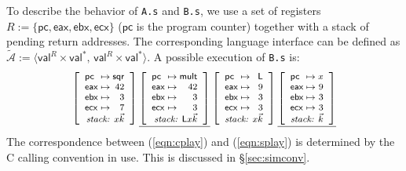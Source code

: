 \documentclass[sigplan,screen]{acmart}
\newcommand{\kw}[1]{\ensuremath{ \mathsf{#1} }}
\begin{document}
\begin{example}
To describe the behavior of \texttt{A.s} and \texttt{B.s},
we use a set of registers
$R := \{ \kw{pc}, \kw{eax}, \kw{ebx}, \kw{ecx} \}$
($\kw{pc}$ is the program counter)
together with a stack of pending return addresses.
The corresponding language interface can be defined as
$\tilde{\mathcal{A}} :=
 \langle \kw{val}^R \times \kw{val}^*, \,
         \kw{val}^R \times \kw{val}^* \rangle$.
A possible execution of \texttt{B.s}
is: %
\begin{equation} \label{eqn:splay}
{
  \footnotesize
  \left[
    \begin{array}{l@{{} \mapsto {}}r}
      \kw{pc}  & \kw{sqr} \\
      \kw{eax} & 42 \\
      \kw{ebx} & 3 \\
      \kw{ecx} & 7 \\
      \multicolumn{2}{r}{\textit{stack: } x \vec{k}}
    \end{array}
  \right] %
  \underline{
    \left[
      \begin{array}{l@{{} \mapsto {}}r}
        \kw{pc}  & \kw{mult} \\
        \kw{eax} & 42 \\
        \kw{ebx} & 3 \\
        \kw{ecx} & 3 \\
        \multicolumn{2}{r}{\textit{stack: } \kw{L} x \vec{k}}
      \end{array}
    \right]} %
  \left[
    \begin{array}{l@{{} \mapsto {}}r}
      \kw{pc}  & \kw{L} \\
      \kw{eax} & 9 \\
      \kw{ebx} & 3 \\
      \kw{ecx} & 3 \\
      \multicolumn{2}{r}{\textit{stack: } x \vec{k}}
    \end{array}
  \right] %
  \underline{
    \left[
      \begin{array}{l@{{} \mapsto {}}r}
        \kw{pc}  & x \\
        \kw{eax} & 9 \\
        \kw{ebx} & 3 \\
        \kw{ecx} & 3 \\
        \multicolumn{2}{r}{\textit{stack: } \vec{k}}
      \end{array}
    \right]}
}
\end{equation}
The correspondence between (\ref{eqn:cplay}) and (\ref{eqn:splay})
is determined by the C calling convention in use.
This is discussed in \S\ref{sec:simconv}.
\end{example}
\end{document}
